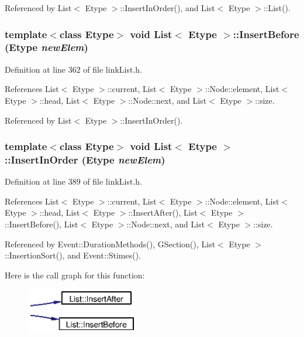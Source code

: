 Referenced by List$<$ Etype $>$::Insert\-In\-Order(), and List$<$ Etype $>$::List().
\subsubsection{\setlength{\rightskip}{0pt plus 5cm}template$<$class Etype$>$ void {\bf List}$<$ Etype $>$::Insert\-Before (Etype {\em new\-Elem})}\label{classList_a7}




Definition at line 362 of file link\-List.h.

References List$<$ Etype $>$::current, List$<$ Etype $>$::Node::element, List$<$ Etype $>$::head, List$<$ Etype $>$::Node::next, and List$<$ Etype $>$::size.

Referenced by List$<$ Etype $>$::Insert\-In\-Order().
\subsubsection{\setlength{\rightskip}{0pt plus 5cm}template$<$class Etype$>$ void {\bf List}$<$ Etype $>$::Insert\-In\-Order (Etype {\em new\-Elem})}\label{classList_a8}




Definition at line 389 of file link\-List.h.

References List$<$ Etype $>$::current, List$<$ Etype $>$::Node::element, List$<$ Etype $>$::head, List$<$ Etype $>$::Insert\-After(), List$<$ Etype $>$::Insert\-Before(), List$<$ Etype $>$::Node::next, and List$<$ Etype $>$::size.

Referenced by Event::Duration\-Methods(), GSection(), List$<$ Etype $>$::Insertion\-Sort(), and Event::Stimes().

Here is the call graph for this function:\begin{figure}[H]
\begin{center}
\leavevmode
\includegraphics[width=139pt]{classList_a8_cgraph}
\end{center}
\end{figure}
